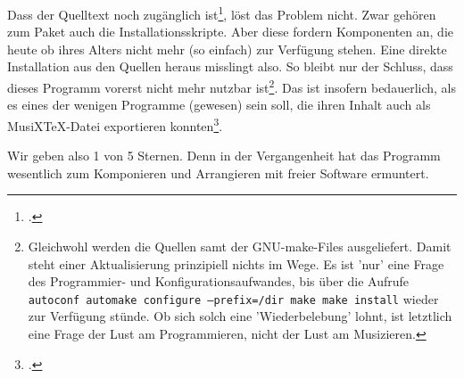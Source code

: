 Dass der Quelltext noch zugänglich
ist\footcite[vgl.][\nopage]{NoteeditRep2014a}, löst das Problem nicht. Zwar
gehören zum Paket auch die Installationsskripte. Aber diese fordern Komponenten an,
die heute ob ihres Alters nicht mehr (so einfach) zur Verfügung stehen. Eine
direkte Installation aus den Quellen heraus misslingt also. So bleibt nur der
Schluss, dass dieses Programm vorerst nicht mehr nutzbar ist\footnote{Gleichwohl
werden die Quellen samt der GNU-make-Files ausgeliefert. Damit steht einer
Aktualisierung prinzipiell nichts im Wege. Es ist 'nur' eine Frage des
Programmier- und Konfigurationsaufwandes, bis  über die Aufrufe
\texttt{autoconf automake configure --prefix=/dir make make install} wieder zur
Verfügung stünde. Ob sich solch eine 'Wiederbelebung' lohnt, ist letztlich eine
Frage der Lust am Programmieren, nicht der Lust am Musizieren. }. Das ist
insofern bedauerlich, als es eines der wenigen Programme (gewesen) sein soll,
die ihren Inhalt auch als MusiX\TeX-Datei exportieren
konnten\footcite[vgl.][\nopage wp]{Roitman2007a}.

Wir geben  also 1 von 5 Sternen. Denn in der Vergangenheit hat das
Programm wesentlich zum Komponieren und Arrangieren mit freier Software
ermuntert.


%
